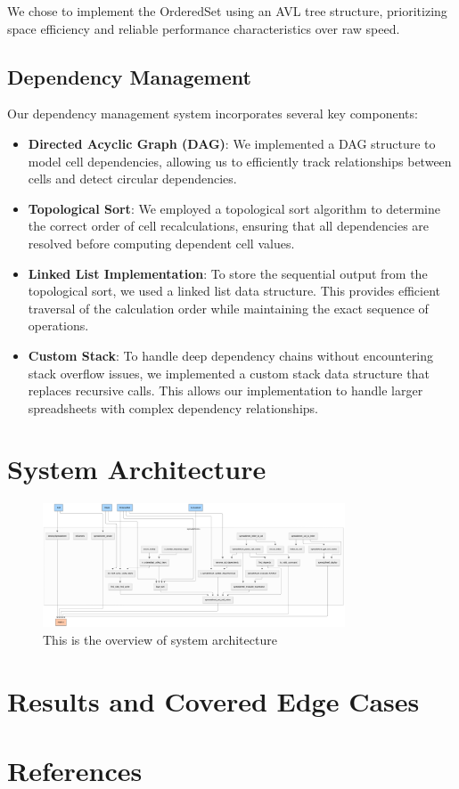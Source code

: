 \documentclass[10pt,a4paper]{article}  %
\begin{document}
We chose to implement the OrderedSet using an AVL tree structure, prioritizing space efficiency and reliable performance characteristics over raw speed.

\subsection{Dependency Management}
Our dependency management system incorporates several key components:

\begin{itemize}
    \item \textbf{Directed Acyclic Graph (DAG)}: We implemented a DAG structure to model cell dependencies, allowing us to efficiently track relationships between cells and detect circular dependencies.
    
    \item \textbf{Topological Sort}: We employed a topological sort algorithm to determine the correct order of cell recalculations, ensuring that all dependencies are resolved before computing dependent cell values.
    
    \item \textbf{Linked List Implementation}: To store the sequential output from the topological sort, we used a linked list data structure. This provides efficient traversal of the calculation order while maintaining the exact sequence of operations.
    
    \item \textbf{Custom Stack}: To handle deep dependency chains without encountering stack overflow issues, we implemented a custom stack data structure that replaces recursive calls. This allows our implementation to handle larger spreadsheets with complex dependency relationships.
\end{itemize}

\section{System Architecture}
\begin{figure}[h!]
    \centering
    \includegraphics[width=0.8\textwidth]{flowchart.png}
    \caption{This is the overview of system architecture}
    \label{fig:system_architecture}
\end{figure}

\section{Results and Covered Edge Cases}

\section{References}
\end{document}
